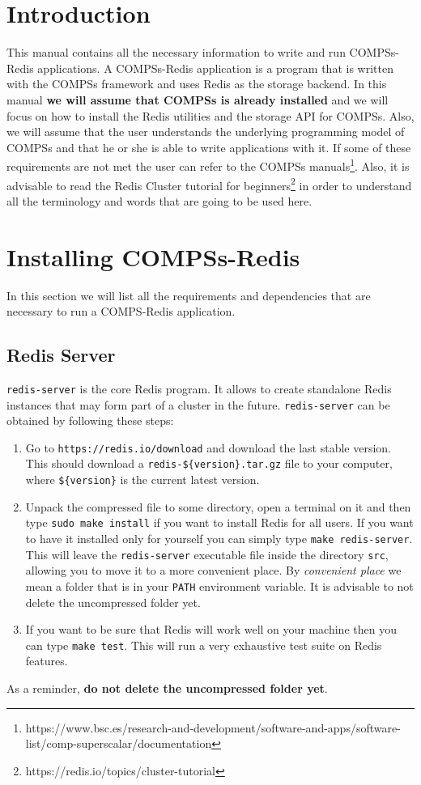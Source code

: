 \documentclass{article}
\begin{document}
\section{Introduction}
This manual contains all the necessary information to write and run COMPSs-Redis applications. A COMPSs-Redis application is a program that is written with the COMPSs framework and uses Redis as the storage backend.
In this manual \textbf{we will assume that COMPSs is already installed} and we will focus on how to install the Redis utilities and the storage API for COMPSs. Also, we will assume that the user understands the underlying programming model of COMPSs and that he or she is able to write applications with it. If some of these requirements are not met the user can refer to the COMPSs manuals\footnote{https://www.bsc.es/research-and-development/software-and-apps/software-list/comp-superscalar/documentation}. Also, it is advisable to read the Redis Cluster tutorial for beginners\footnote{https://redis.io/topics/cluster-tutorial} in order to understand all the terminology and words that are going to be used here.

\section{Installing COMPSs-Redis}
In this section we will list all the requirements and dependencies that are necessary to run a COMPS-Redis application.
\subsection{Redis Server}
\verb|redis-server| is the core Redis program. It allows to create standalone Redis instances that may form part of a cluster in the future. \verb|redis-server| can be obtained by following these steps:
\begin{enumerate}
\item Go to \verb|https://redis.io/download| and download the last stable version. This should download a \verb|redis-${version}.tar.gz| file to your computer, where \verb|${version}| is the current latest version.
\item Unpack the compressed file to some directory, open a terminal on it and then type \verb|sudo make install| if you want to install Redis for all users. If you want to have it installed only for yourself you can simply type \verb|make redis-server|. This will leave the \verb|redis-server| executable file inside the directory \verb|src|, allowing you to move it to a more convenient place. By \textit{convenient place} we mean a folder that is in your \verb|PATH| environment variable. It is advisable to not delete the uncompressed folder yet.
\item If you want to be sure that Redis will work well on your machine then you can type \verb|make test|. This will run a very exhaustive test suite on Redis features.
\end{enumerate}
As a reminder, \textbf{do not delete the uncompressed folder yet}.
\end{document}
